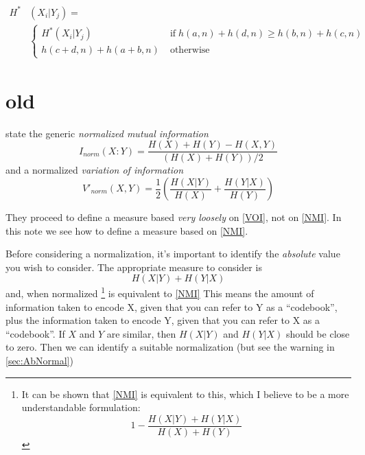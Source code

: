 \documentclass[9pt,technote]{IEEEtran}
\begin{document}
\begin{equation}
	\begin{split}
	H^* & (X_i | Y_j) = \\
	& \left\{
		\begin{split}
			H^*(X_i | Y_j) \; & \mbox{if} \; h(a,n) + h(d,n) \geq h(b,n) + h(c,n) \\
			h(c+d,n)+h(a+b,n) \;  & \mbox{otherwise}
		\end{split}
	\right.
	\end{split}
\end{equation}

\section{old}

\citet{lancichinetti-2009} state the generic \emph{normalized mutual information}
\begin{equation}
	I_{norm}(X:Y) = \frac { H(X) + H(Y) - H(X,Y) } { \left( H(X) + H(Y) \right ) /2 }   \label{NMI}
\end{equation}
and a normalized \emph{variation of information} 
\begin{equation}
	V'_{norm}(X,Y) = \frac12 \left(  \frac{ H(X|Y) }{ H(X) } + \frac{ H(Y|X) }{ H(Y) } \right)   \label{VOI}
\end{equation}

They proceed to define a measure based \emph{very loosely} on \cref{VOI}, not on \cref{NMI}. In this note we see how to define a measure
based on \cref{NMI}.

Before considering a normalization, it's important to identify the \emph{absolute} value you wish to consider.
The appropriate measure to consider is
\begin{equation}
	H(X|Y) + H(Y|X)   \label{CorrectMI}
\end{equation}
and, when normalized \footnote{
	It can be shown that \cref{NMI} is equivalent to this, which I believe to be a more understandable formulation:
 \[
	1 - \frac { H(X|Y) + H(Y|X)  }{ H(X) + H(Y) } 
	\]
} is equivalent to \cref{NMI}
This means the amount of information taken to encode X, given that you can refer to Y as a ``codebook'', plus
the information taken to encode Y, given that you can refer to X as a ``codebook''. If $X$ and $Y$ are similar, then
$H(X|Y)$ and $H(Y|X)$ should be close to zero. Then we can identify a suitable normalization (but see the warning in \cref{sec:AbNormal})

\begin{comment}
\section{WARNING}
I'm pretty sloppy, as ever, with my terminology. I just take $H(x)$ to mean the number of bits taken to encode $x$. Hence
I tend to think in $\log_2$, the log to the base 2, when technically I suppose it should be $\log_e$. There's lots of other careless things too, no doubt \begin{turn}{90}(-:\end{turn}.
\end{comment}
\end{document}
